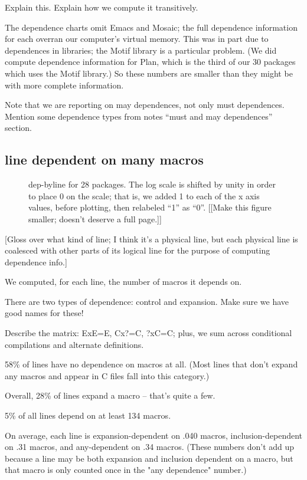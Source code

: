 \documentclass[10pt]{article}
\begin{document}
 Explain this.  Explain how we compute it transitively.
 
 The dependence charts omit Emacs and Mosaic; the full dependence
 information for each overran our computer's virtual memory.  This was in
 part due to dependences in libraries; the Motif library is a particular
 problem.  (We did compute dependence information for Plan, which is the
 third of our 30 packages which uses the Motif library.)  So these numbers
 are smaller than they might be with more complete information.

Note that we are reporting on may dependences, not only must dependences.
Mention some dependence types from notes ``must and may dependences'' section.

\subsection{line dependent on many macros}

\begin{figure}
\centerline{}
\caption{dep-byline for 28 packages.
The log scale is shifted by unity in order to place 0 on the scale; that
is, we added 1 to each of the x axis values, before plotting, then
relabeled ``1'' as ``0''.
[[Make this figure smaller; doesn't deserve a full page.]]}
\label{fig:dep-byline}
\end{figure}


    [Gloss over what kind of line; I think it's a physical line, but each
      physical line is coalesced with other parts of its logical line for
      the purpose of computing dependence info.]

    We computed, for each line, the number of macros it depends on.

There are two types of dependence:  control and expansion.  Make sure we
have good names for these!

    Describe the matrix:  ExE=E, Cx?=C, ?xC=C; plus, we sum across
      conditional compilations and alternate definitions.

    
      58\% of lines have no dependence on macros at all.  (Most lines that
      don't expand any macros and appear in C files fall into this category.)

    Overall, 28\% of lines expand a macro -- that's quite a few.

    5\% of all lines depend on at least 134 macros.

    On average, each line is expansion-dependent on .040 macros,
      inclusion-dependent on .31 macros, and any-dependent on .34 macros.
      (These numbers don't add up because a line may be both expansion and
      inclusion dependent on a macro, but that macro is only counted once
      in the "any dependence" number.)
      
\end{document}
